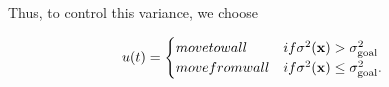 Thus, to control this variance, we choose

\begin{align}\label{eq:controlVariance}
u(t) &=   \begin{cases}
	 \mbox{move to wall} &\mbox{if } \sigma^2(\mathbf{x})>\sigma^2_{\rm{goal}} \\ 
	 \mbox{move from wall} & \mbox{if } \sigma^2(\mathbf{x}) \le \sigma^2_{\rm{goal}}.
\end{cases} 
\end{align}



